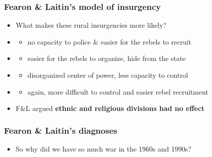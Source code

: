 \documentclass[aspectratio=43]{beamer}
\begin{document}
\begin{frame}
\frametitle{Fearon \& Laitin's model of insurgency}
\centering

\begin{itemize}
  \item[] What makes these rural insurgencies more likely?
  \item {}
  \begin{itemize}
    \item no capacity to police \& easier for the rebels to recruit
  \end{itemize}
  \item {}
  \begin{itemize}
    \item easier for the rebels to organize, hide from the state
  \end{itemize}
  \item {}
  \begin{itemize}
    \item disorganized center of power, less capacity to control
  \end{itemize}
  \item {}
  \begin{itemize}
    \item again, more difficult to control and easier rebel recruitment
  \end{itemize}
  \item<6-> F\&L argued \textbf{ethnic and religious divisions had no effect}
\end{itemize}

\end{frame}

\begin{frame}
\frametitle{Fearon \& Laitin's diagnoses}
\centering

\begin{itemize}
  \item So why did we have so much war in the 1960s and 1990s?
\end{itemize}

\end{frame}
\end{document}
